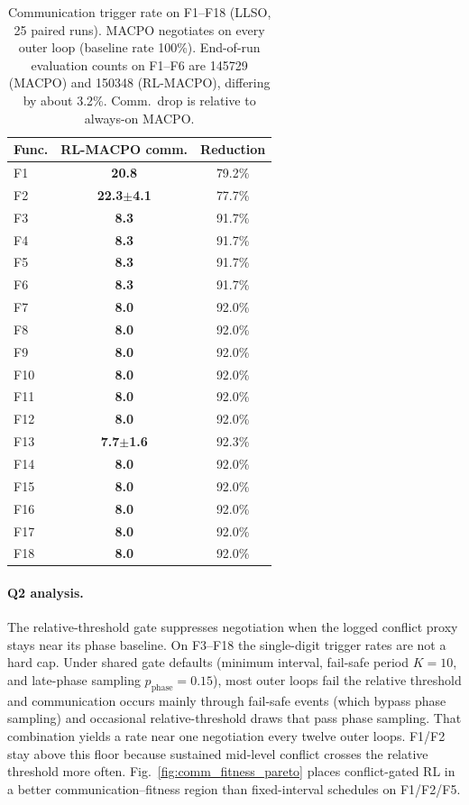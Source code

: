 \documentclass[conference]{IEEEtran}
\begin{document}
\begin{table}[!t]
\centering
\scriptsize
\setlength{\tabcolsep}{4pt}
\caption{Communication trigger rate on F1--F18 (LLSO, 25 paired runs). MACPO negotiates on every outer loop (baseline rate 100\%). End-of-run evaluation counts on F1--F6 are 145729 (MACPO) and 150348 (RL-MACPO), differing by about 3.2\%. Comm.\ drop is relative to always-on MACPO.}
\label{tab:comm_rate_f1_f18}
\begin{tabular}{@{}lcc@{}}
\toprule
\textbf{Func.} & \textbf{RL-MACPO comm.} & \textbf{Reduction} \\
\midrule
F1 & \textbf{20.8} & 79.2\% \\
F2 & \textbf{22.3{\scriptsize $\pm$4.1}} & 77.7\% \\
F3 & \textbf{8.3} & 91.7\% \\
F4 & \textbf{8.3} & 91.7\% \\
F5 & \textbf{8.3} & 91.7\% \\
F6 & \textbf{8.3} & 91.7\% \\
F7 & \textbf{8.0} & 92.0\% \\
F8 & \textbf{8.0} & 92.0\% \\
F9 & \textbf{8.0} & 92.0\% \\
F10 & \textbf{8.0} & 92.0\% \\
F11 & \textbf{8.0} & 92.0\% \\
F12 & \textbf{8.0} & 92.0\% \\
F13 & \textbf{7.7{\scriptsize $\pm$1.6}} & 92.3\% \\
F14 & \textbf{8.0} & 92.0\% \\
F15 & \textbf{8.0} & 92.0\% \\
F16 & \textbf{8.0} & 92.0\% \\
F17 & \textbf{8.0} & 92.0\% \\
F18 & \textbf{8.0} & 92.0\% \\
\bottomrule
\end{tabular}
\end{table}

\paragraph{Q2 analysis.} The relative-threshold gate suppresses negotiation when the logged conflict proxy stays near its phase baseline. On F3--F18 the single-digit trigger rates are not a hard cap. Under shared gate defaults (minimum interval, fail-safe period $K{=}10$, and late-phase sampling $p_{\mathrm{phase}}{=}0.15$), most outer loops fail the relative threshold and communication occurs mainly through fail-safe events (which bypass phase sampling) and occasional relative-threshold draws that pass phase sampling. That combination yields a rate near one negotiation every twelve outer loops. F1/F2 stay above this floor because sustained mid-level conflict crosses the relative threshold more often. Fig.~\ref{fig:comm_fitness_pareto} places conflict-gated RL in a better communication--fitness region than fixed-interval schedules on F1/F2/F5.
\end{document}
